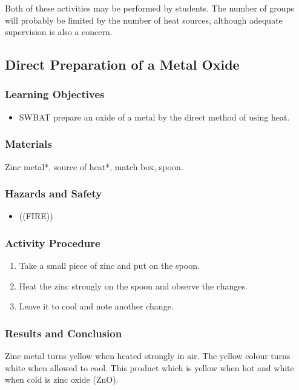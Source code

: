 Both of these activities may be performed by students. The number of groups will probably be limited by the number of heat sources, although adequate supervision is also a concern.

\subsection{Direct Preparation of a Metal Oxide}

\subsubsection*{Learning Objectives}
\begin{itemize}
\item{SWBAT prepare an oxide of a metal by the direct method of using heat.}
\end{itemize}

\subsubsection*{Materials}
Zinc metal*, source of heat*, match box, spoon.

\subsubsection*{Hazards and Safety}
\begin{itemize}
\item{((FIRE))}
\end{itemize}

\subsubsection*{Activity Procedure}
\begin{enumerate}
\item{Take a small piece of zinc and put on the spoon.}
\item{Heat the zinc strongly on the spoon and observe the changes.}
\item{Leave it to cool and note another change.}
\end{enumerate}

\subsubsection*{Results and Conclusion}
Zinc metal turns yellow when heated strongly in air. The yellow colour turns white when allowed to cool. This product which is yellow when hot and white when cold is zinc oxide (ZnO).

